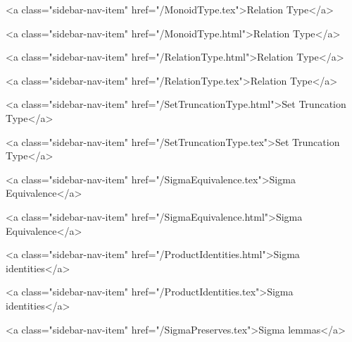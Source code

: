       
    
      
        
          <a class="sidebar-nav-item" href="/MonoidType.tex">Relation Type</a>
        
      
    
      
        
          <a class="sidebar-nav-item" href="/MonoidType.html">Relation Type</a>
        
      
    
      
        
          <a class="sidebar-nav-item" href="/RelationType.html">Relation Type</a>
        
      
    
      
        
          <a class="sidebar-nav-item" href="/RelationType.tex">Relation Type</a>
        
      
    
      
        
          <a class="sidebar-nav-item" href="/SetTruncationType.html">Set Truncation Type</a>
        
      
    
      
        
          <a class="sidebar-nav-item" href="/SetTruncationType.tex">Set Truncation Type</a>
        
      
    
      
        
          <a class="sidebar-nav-item" href="/SigmaEquivalence.tex">Sigma Equivalence</a>
        
      
    
      
        
          <a class="sidebar-nav-item" href="/SigmaEquivalence.html">Sigma Equivalence</a>
        
      
    
      
        
          <a class="sidebar-nav-item" href="/ProductIdentities.html">Sigma identities</a>
        
      
    
      
        
          <a class="sidebar-nav-item" href="/ProductIdentities.tex">Sigma identities</a>
        
      
    
      
        
          <a class="sidebar-nav-item" href="/SigmaPreserves.tex">Sigma lemmas</a>
        
